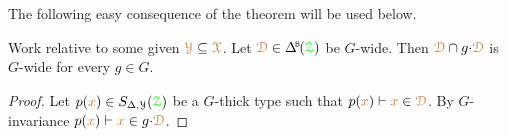 The following easy consequence of the theorem will be used below.

\begin{corollary}\label{corol_intersectionGwide}
  Work relative to some given ${\color{brown}\EuScript Y}\subseteq{\color{brown}\EuScript X}$.
  Let $\mrD\in\BDelta(\grZ)$ be $G$-wide.
  Then ${\color{brown}\EuScript D}\cap g{\cdot}{\color{brown}\EuScript D}$ is $G$-wide for every $g\in G$.
\end{corollary}

\begin{proof}
  Let $p({\color{brown} x})\in S_{\Delta,\EuScript Y}({\color{green}\EuScript Z})$ be a $G$-thick type such that $p({\color{brown} x})\vdash{\color{brown}x}\in{\color{brown}\EuScript D}$.
  By $G$-invariance $p({\color{brown} x})\vdash{\color{brown}x}\in g{\cdot}{\color{brown}\EuScript D}$.
\end{proof}





